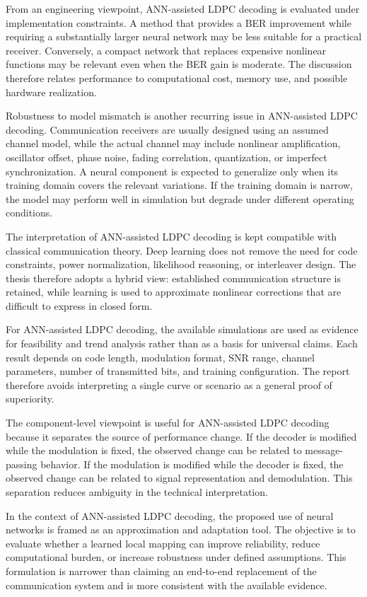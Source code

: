 From an engineering viewpoint, ANN-assisted LDPC decoding is evaluated under implementation constraints. A method that provides a BER improvement while requiring a substantially larger neural network may be less suitable for a practical receiver. Conversely, a compact network that replaces expensive nonlinear functions may be relevant even when the BER gain is moderate. The discussion therefore relates performance to computational cost, memory use, and possible hardware realization.

Robustness to model mismatch is another recurring issue in ANN-assisted LDPC decoding. Communication receivers are usually designed using an assumed channel model, while the actual channel may include nonlinear amplification, oscillator offset, phase noise, fading correlation, quantization, or imperfect synchronization. A neural component is expected to generalize only when its training domain covers the relevant variations. If the training domain is narrow, the model may perform well in simulation but degrade under different operating conditions.

The interpretation of ANN-assisted LDPC decoding is kept compatible with classical communication theory. Deep learning does not remove the need for code constraints, power normalization, likelihood reasoning, or interleaver design. The thesis therefore adopts a hybrid view: established communication structure is retained, while learning is used to approximate nonlinear corrections that are difficult to express in closed form.

For ANN-assisted LDPC decoding, the available simulations are used as evidence for feasibility and trend analysis rather than as a basis for universal claims. Each result depends on code length, modulation format, SNR range, channel parameters, number of transmitted bits, and training configuration. The report therefore avoids interpreting a single curve or scenario as a general proof of superiority.

The component-level viewpoint is useful for ANN-assisted LDPC decoding because it separates the source of performance change. If the decoder is modified while the modulation is fixed, the observed change can be related to message-passing behavior. If the modulation is modified while the decoder is fixed, the observed change can be related to signal representation and demodulation. This separation reduces ambiguity in the technical interpretation.

In the context of ANN-assisted LDPC decoding, the proposed use of neural networks is framed as an approximation and adaptation tool. The objective is to evaluate whether a learned local mapping can improve reliability, reduce computational burden, or increase robustness under defined assumptions. This formulation is narrower than claiming an end-to-end replacement of the communication system and is more consistent with the available evidence.

